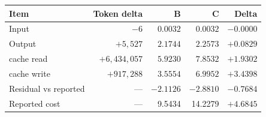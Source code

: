\begin{tabular}{lrrrr}
\toprule Item & Token delta & B & C & Delta\\\midrule
Input & $-6$ & $0.0032$ & $0.0032$ & $-0.0000$ \\
Output & $+5,527$ & $2.1744$ & $2.2573$ & $+0.0829$ \\
cache read & $+6,434,057$ & $5.9230$ & $7.8532$ & $+1.9302$ \\
cache write & $+917,288$ & $3.5554$ & $6.9952$ & $+3.4398$ \\
Residual vs reported & --- & $-2.1126$ & $-2.8810$ & $-0.7684$ \\
\midrule Reported cost & --- & 9.5434 & 14.2279 & $+4.6845$ \\
\bottomrule
\end{tabular}
